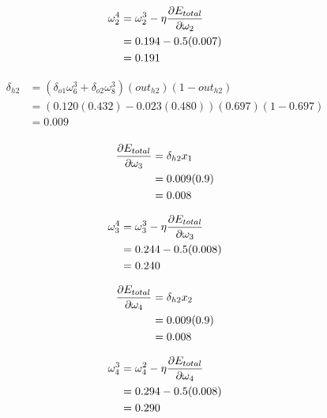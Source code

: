 \documentclass[10pt,a4paper]{article}
\begin{document}
\begin{equation}
\begin{split}
\omega_2^4 &= \omega_2^3 - \eta\pdv{E_{total}}{\omega_2}\\
           &= 0.194 -0.5(0.007)\\
           &= 0.191\\
\end{split}
\end{equation}

\begin{equation}
\begin{split}
\delta_{h2} &= (\delta_{o1}\omega_6^3 + \delta_{o2}\omega_8^3)(out_{h2})(1-out_{h2})\\
&= (0.120(0.432) -0.023(0.480))(0.697)(1-0.697)\\
&= 0.009\\
\end{split}
\end{equation}

\begin{equation}
\begin{split}
\pdv{E_{total}}{\omega_3} &= \delta_{h2}x_1\\ 
                          &= 0.009(0.9)\\
                          &= 0.008\\
\end{split}
\end{equation}

\begin{equation}
\begin{split}
\omega_3^4 &= \omega_3^3 - \eta\pdv{E_{total}}{\omega_3}\\
           &= 0.244 -0.5(0.008)\\
           &= 0.240\\
\end{split}
\end{equation}

\begin{equation}
\begin{split}
\pdv{E_{total}}{\omega_4} &= \delta_{h2}x_2\\ 
                          &= 0.009(0.9)\\
                          &= 0.008\\
\end{split}
\end{equation}

\begin{equation}
\begin{split}
\omega_4^3 &= \omega_4^2 - \eta\pdv{E_{total}}{\omega_4}\\
           &= 0.294 -0.5(0.008)\\
           &= 0.290\\
\end{split}
\end{equation}
\end{document}
